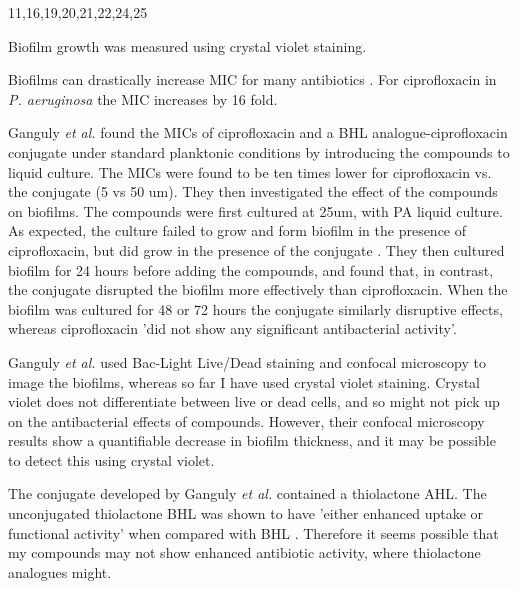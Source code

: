 11,16,19,20,21,22,24,25


Biofilm growth was measured using crystal violet staining\cite{OToole1998}.









Biofilms can drastically increase MIC for many antibiotics \cite{Ceri1999}. For ciprofloxacin in \textit{P. aeruginosa} the MIC increases by 16 fold. 

Ganguly \textit{et al.} \cite{Ganguly2011} found the MICs of ciprofloxacin and a BHL analogue-ciprofloxacin  conjugate under standard planktonic conditions by introducing the compounds to liquid culture. The MICs were found to be ten times lower for ciprofloxacin vs. the conjugate  (5 vs 50 um). They then investigated the effect of the compounds on biofilms. The compounds were first cultured at 25um, with PA liquid culture. As expected, the culture failed to grow and form biofilm in the presence of ciprofloxacin, but did grow in the presence of the conjugate . They then cultured biofilm for 24 hours before adding the compounds, and found that, in contrast, the conjugate  disrupted the biofilm more effectively than ciprofloxacin. When the biofilm was cultured for 48 or 72 hours the conjugate similarly disruptive effects, whereas ciprofloxacin 'did not show any significant antibacterial activity'.

Ganguly \textit{et al.} used Bac-Light Live/Dead staining and confocal microscopy to image the biofilms, whereas so far I have used crystal violet staining. Crystal violet does not differentiate between live or dead cells, and so might not pick up on the antibacterial effects of compounds. However, their confocal microscopy results show a quantifiable decrease in biofilm thickness, and it may be possible to detect this using crystal violet.

The conjugate  developed by Ganguly \textit{et al.} contained a thiolactone AHL. The unconjugated thiolactone BHL  was shown to have 'either enhanced uptake or functional activity' when compared with BHL . Therefore it seems possible that my compounds may not show enhanced antibiotic activity, where thiolactone analogues might.
